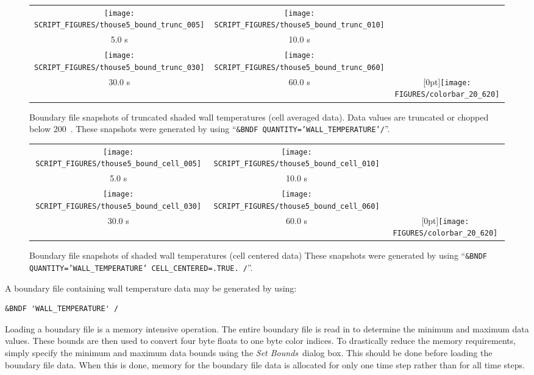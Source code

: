\documentclass[11pt,twoside]{book}
\begin{document}
\begin{figure}[\figoptions]
\begin{center}
\begin{tabular}{ccc}
\texttt{[image: SCRIPT\_FIGURES/thouse5\_bound\_trunc\_005]}&
\texttt{[image: SCRIPT\_FIGURES/thouse5\_bound\_trunc\_010]}\\
5.0 s&10.0 s\\
\texttt{[image: SCRIPT\_FIGURES/thouse5\_bound\_trunc\_030]}&
\texttt{[image: SCRIPT\_FIGURES/thouse5\_bound\_trunc\_060]}\\
30.0 s&60.0 s
&\raisebox{0.0ex}[0pt]{\texttt{[image: FIGURES/colorbar\_20\_620]}}\\
\end{tabular}
\end{center}
\caption [Boundary file snapshots of truncated shaded wall
temperatures contours (cell averaged data).] {Boundary file
snapshots of truncated shaded wall temperatures (cell averaged
data).  Data values are truncated or chopped below 200~\degC.
These snapshots were generated by using ``{\tt\&BNDF
QUANTITY='WALL\_TEMPERATURE'/}''. }
\label{figtruncboundary}%
\end{figure}

\begin{figure}[\figoptions]
\begin{center}
\begin{tabular}{ccc}
\texttt{[image: SCRIPT\_FIGURES/thouse5\_bound\_cell\_005]}&
\texttt{[image: SCRIPT\_FIGURES/thouse5\_bound\_cell\_010]}\\
5.0 s&10.0 s\\
\texttt{[image: SCRIPT\_FIGURES/thouse5\_bound\_cell\_030]}&
\texttt{[image: SCRIPT\_FIGURES/thouse5\_bound\_cell\_060]}\\
30.0 s&60.0 s
&\raisebox{0.0ex}[0pt]{\texttt{[image: FIGURES/colorbar\_20\_620]}}\\
\end{tabular}
\end{center}
\caption [Boundary file snapshots of shaded wall temperatures
contours (cell centered data).] {Boundary file snapshots of shaded
wall temperatures (cell centered data) These snapshots were
generated by using ``{\tt\&BNDF QUANTITY='WALL\_TEMPERATURE'
CELL\_CENTERED=.TRUE. /}''. }
\label{figboundary_cell_centered}%
\end{figure}
A boundary file containing wall temperature data may be generated
by using:
\begin{lstlisting}
&BNDF 'WALL_TEMPERATURE' /
\end{lstlisting}
Loading a boundary file is a memory intensive operation.  The
entire boundary file is read in to determine the minimum and
maximum data values.  These bounds are then used to convert four
byte floats to one byte color indices.  To drastically reduce the
memory requirements, simply specify the minimum and maximum data
bounds using the {\em Set Bounds}\ dialog box.  This should be
done before loading the boundary file data.  When this is done,
memory for the boundary file data is allocated for only one time
step rather than for all time steps.
\end{document}
